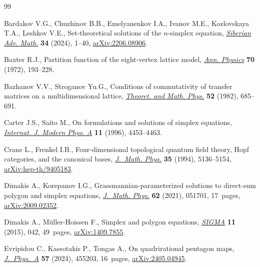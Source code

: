 \documentclass[10pt,a4paper]{amsart}
\numberwithin{equation}{section}
\theoremstyle{definition}
\begin{document}

\begin{thebibliography}{99}
\footnotesize\itemsep=0pt

Bardakov V.G., Chuzhinov B.B., Emelyanenkov I.A., Ivanov M.E., Kozlovskaya
 T.A., Leshkov V.E., Set-theoretical solutions of the {$n$}-simplex equation,
 \href{https://doi.org/10.1134/s1055134424010012}{\textit{Siberian Adv.
 Math.}} \textbf{34} (2024), 1--40,
 \href{https://arxiv.org/abs/2206.08906}{arXiv:2206.08906}.

Baxter R.J., Partition function of the eight-vertex lattice model,
 \href{https://doi.org/10.1016/0003-4916(72)90335-1}{\textit{Ann. Physics}}
 \textbf{70} (1972), 193--228.

Bazhanov V.V., Stroganov Yu.G., Conditions of commutativity of transfer matrices
 on a multidimensional lattice,
 \href{https://doi.org/10.1007/BF01027789}{\textit{Theoret. and Math. Phys.}}
 \textbf{52} (1982), 685--691.

Carter J.S., Saito M., On formulations and solutions of simplex equations,
 \href{https://doi.org/10.1142/S0217751X96002066}{\textit{Internat. J. Modern
 Phys. A}} \textbf{11} (1996), 4453--4463.

Crane L., Frenkel I.B., Four-dimensional topological quantum field theory,
 {H}opf categories, and the canonical bases,
 \href{https://doi.org/10.1063/1.530746}{\textit{J.~Math. Phys.}} \textbf{35}
 (1994), 5136--5154,
 \href{https://arxiv.org/abs/hep-th/9405183}{arXiv:hep-th/9405183}.

Dimakis A., Korepanov I.G., Grassmannian-parameterized solutions to direct-sum
 polygon and simplex equations,
 \href{https://doi.org/10.1063/5.0035760}{\textit{J.~Math. Phys.}} \textbf{62}
 (2021), 051701, 17~pages,
 \href{https://arxiv.org/abs/2009.02352}{arXiv:2009.02352}.

Dimakis A., M\"{u}ller-Hoissen F., Simplex and polygon equations,
 \href{https://doi.org/10.3842/SIGMA.2015.042}{\textit{SIGMA}} \textbf{11}
 (2015), 042, 49~pages,
 \href{https://arxiv.org/abs/1409.7855}{arXiv:1409.7855}.

Evripidou C., Kassotakis P., Tongas A., On quadrirational pentagon maps,
 \href{https://doi.org/10.1088/1751-8121/ad85b1}{\textit{J.~Phys.~A}}
 \textbf{57} (2024), 455203, 16~pages,
 \href{https://arxiv.org/abs/2405.04945}{arXiv:2405.04945}.


\end{thebibliography}
\end{document}
